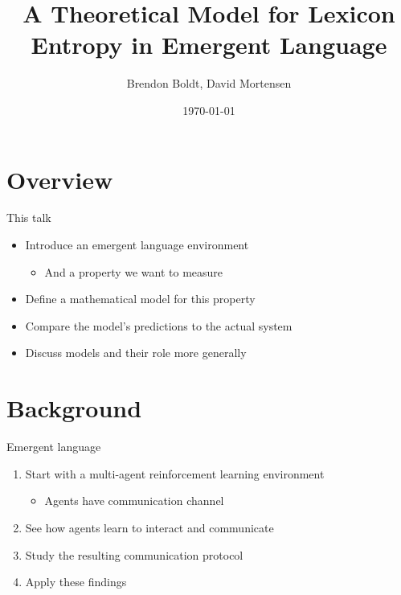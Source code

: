 \documentclass{beamer}
\title{A Theoretical Model for Lexicon Entropy in Emergent Language}
\author{Brendon Boldt, David Mortensen}
\date{\today}
\begin{document}
\maketitle

\section{Overview}

\begin{frame}{This talk}
    \begin{itemize}
        \item Introduce an emergent language environment
            \begin{itemize}
                \item And a property we want to measure
            \end{itemize}
        \item Define a mathematical model for this property
        \item Compare the model's predictions to the actual system
        \item Discuss models and their role more generally
    \end{itemize}
\end{frame}

\section{Background}

\begin{frame}{Emergent language}
    \begin{enumerate}
        \item Start with a multi-agent reinforcement learning environment
            \begin{itemize}
                \item Agents have communication channel
            \end{itemize}
        \item See how agents learn to interact and communicate
        \item Study the resulting communication protocol
        \item Apply these findings
    \end{enumerate}
\end{frame}
\end{document}
